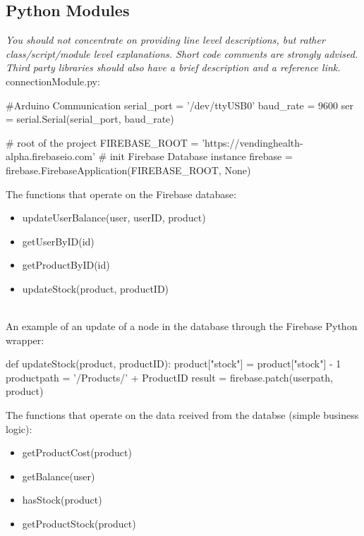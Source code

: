 \documentclass[a4paper,11pt]{article}
\begin{document}
\subsection{Python Modules}
\textit{You should not concentrate on providing line level descriptions, but rather class/script/module level explanations. Short code comments are strongly advised. Third party libraries should also have a brief description and a reference link.}\\

connectionModule.py:  \\

\begin{python}
#Arduino Communication
serial_port = '/dev/ttyUSB0'
baud_rate = 9600
ser = serial.Serial(serial_port, baud_rate)
\end{python}

\begin{python}
# root of the project
FIREBASE_ROOT = 'https://vendinghealth-alpha.firebaseio.com'
# init Firebase Database instance
firebase = firebase.FirebaseApplication(FIREBASE_ROOT, None)
\end{python}

The functions that operate on the Firebase database:
\begin{itemize}
\item updateUserBalance(user, userID, product)
\item getUserByID(id)
\item getProductByID(id)
\item updateStock(product, productID)\\\\
\end{itemize}

An example of an update of a node in the database through the Firebase Python wrapper:
\begin{python}
def updateStock(product, productID):
	product["stock"] = product["stock"] - 1
	productpath = '/Products/' + ProductID
	result = firebase.patch(userpath, product)
\end{python}

The functions that operate on the data rceived from the databse (simple business logic):
\begin{itemize}
\item getProductCost(product)
\item getBalance(user)
\item hasStock(product)
\item getProductStock(product)\\
\end{itemize}
\end{document}
